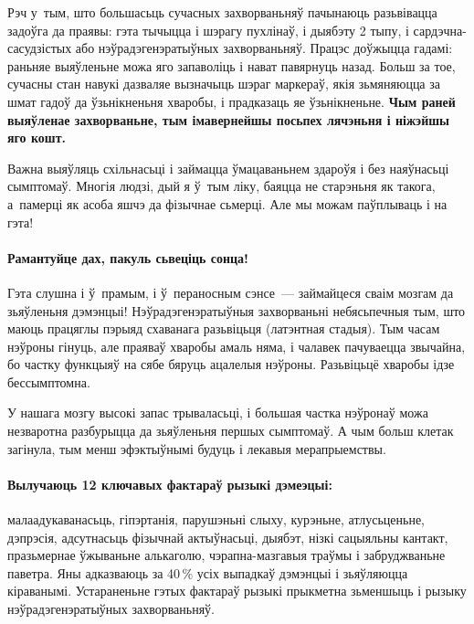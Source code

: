 Рэч у~тым, што большасьць сучасных захворваньняў пачынаюць разьвівацца задоўга да праявы: гэта тычыцца і шэрагу пухлінаў, і дыябэту 2 тыпу, і сардэчна-сасудзістых або нэўрадэгенэратыўных захворваньняў. Працэс доўжыцца гадамі: раньняе выяўленьне можа яго запаволіць і нават павярнуць назад. Больш за тое, сучасны стан навукі дазваляе вызначыць шэраг маркераў, якія зьмяняюцца за шмат гадоў да ўзьнікненьня хваробы, і прадказаць яе ўзьнікненьне. \textbf{Чым раней выяўленае захворваньне, тым імавернейшы посьпех лячэньня і ніжэйшы яго кошт.}

Важна выяўляць схільнасьці і займацца ўмацаваньнем здароўя і без наяўнасьці сымптомаў. Многія людзі, дый я ў~тым ліку, баяцца не старэньня як такога, а~памерці як асоба яшчэ да фізычнае сьмерці. Але мы можам паўплываць і на гэта!

\paragraph{Рамантуйце дах, пакуль сьвеціць сонца!} Гэта слушна і ў~прамым, і ў~пераносным сэнсе~--- займайцеся сваім мозгам да зьяўленьня дэмэнцыі! Нэўрадэгенэратыўныя захворваньні небясьпечныя тым, што маюць працяглы пэрыяд схаванага разьвіцьця (латэнтная стадыя). Тым часам нэўроны гінуць, але праяваў хваробы амаль няма, і чалавек пачуваецца звычайна, бо частку функцыяў на сябе бяруць ацалелыя нэўроны. Разьвіцьцё хваробы ідзе бессымптомна.

У нашага мозгу высокі запас трываласьці, і большая частка нэўронаў можа незваротна разбурыцца да зьяўленьня першых сымптомаў. А чым больш клетак загінула, тым менш эфэктыўнымі будуць і лекавыя мерапрыемствы. 


\paragraph{Вылучаюць 12 ключавых фактараў рызыкі дэмеэцыі:} малаадукаванасьць, гіпэртанія, парушэньні слыху, курэньне, атлусьценьне, дэпрэсія, адсутнасьць фізычнай актыўнасьці, дыябэт, нізкі сацыяльны кантакт, празьмернае ўжываньне алькаголю, чэрапна-мазгавыя траўмы і забруджваньне паветра. Яны адказваюць за 40\,\% усіх выпадкаў дэмэнцыі і зьяўляюцца кіраванымі. Устараненьне гэтых фактараў рызыкі прыкметна зьменшыць і рызыку нэўрадэгенэратыўных захворваньняў.

